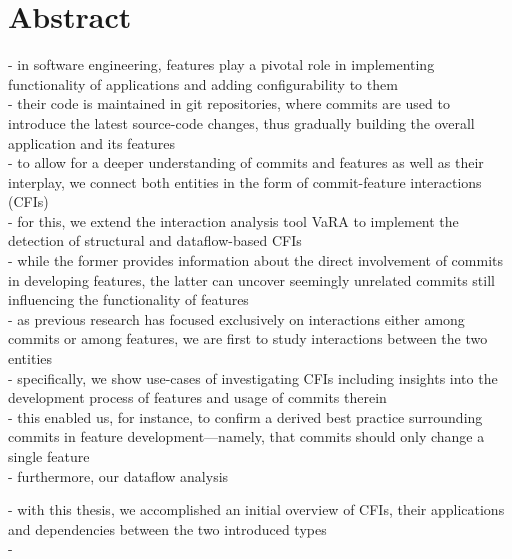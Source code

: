 \begingroup
\let\clearpage\relax
\let\cleardoublepage\relax
\let\cleardoublepage\relax

\chapter*{Abstract}

- in software engineering, features play a pivotal role in implementing functionality of applications and adding configurability to them \\
- their code is maintained in git repositories, where commits are used to introduce the latest source-code changes, thus gradually building the overall application and its features \\ %
- to allow for a deeper understanding of commits and features as well as their interplay, we connect both entities in the form of commit-feature interactions (CFIs) \\
- for this, we extend the interaction analysis tool VaRA to implement the detection of structural and dataflow-based CFIs \\
- while the former provides information about the direct involvement of commits in developing features, the latter can uncover seemingly unrelated commits still influencing the functionality of features \\
- as previous research has focused exclusively on interactions either among commits or among features, we are first to study interactions between the two entities \\
- specifically, we show use-cases of investigating CFIs including insights into the development process of features and usage of commits therein \\
- this enabled us, for instance, to confirm a derived best practice surrounding commits in feature development—namely, that commits should only change a single feature \\ 
- furthermore, our dataflow analysis 

- with this thesis, we accomplished an initial overview of CFIs, their applications and dependencies between the two introduced types \\
- 

\vfill

\endgroup

\vfill

